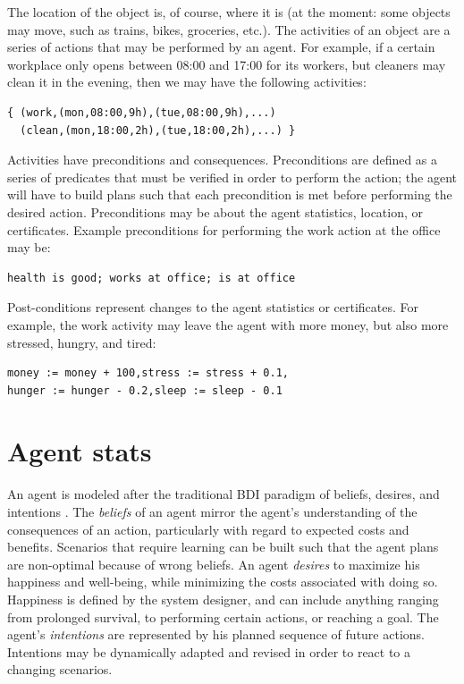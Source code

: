 The location of the object is, of course, where it is (at the moment: some objects may move, such as trains, bikes, groceries, etc.). The activities of an object are a series of actions that may be performed by an agent. For example, if a certain workplace only opens between 08:00 and 17:00 for its workers, but cleaners may clean it in the evening, then we may have the following activities:

\begin{lstlisting}
{ (work,(mon,08:00,9h),(tue,08:00,9h),...)
  (clean,(mon,18:00,2h),(tue,18:00,2h),...) }
\end{lstlisting}

Activities have preconditions and consequences. Preconditions are defined as a series of predicates that must be verified in order to perform the action; the agent will have to build plans such that each precondition is met before performing the desired action. Preconditions may be about the agent statistics, location, or certificates. Example preconditions for performing the work action at the office may be:

\begin{lstlisting}
health is good; works at office; is at office
\end{lstlisting}

Post-conditions represent changes to the agent statistics or certificates. For example, the work activity may leave the agent with more money, but also more stressed, hungry, and tired:

\begin{lstlisting}
money := money + 100,stress := stress + 0.1,
hunger := hunger - 0.2,sleep := sleep - 0.1
\end{lstlisting}


\section{Agent stats}
\label{sec:agent_stats}

An agent is modeled after the traditional BDI paradigm of beliefs, desires, and intentions \cite{APPENDIX_C_BDI}. The \textit{beliefs} of an agent mirror the agent's understanding of the consequences of an action, particularly with regard to expected costs and benefits. Scenarios that require learning can be built such that the agent plans are non-optimal because of wrong beliefs. An agent \textit{desires} to maximize his happiness and well-being, while minimizing the costs associated with doing so. Happiness is defined by the system designer, and can include anything ranging from prolonged survival, to performing certain actions, or reaching a goal. The agent's \textit{intentions} are represented by his planned sequence of future actions. Intentions may be dynamically adapted and revised in order to react to a changing scenarios.

